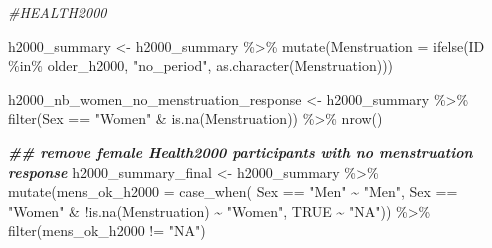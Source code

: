 \documentclass[
]{article}
\newenvironment{Shaded}{\begin{snugshade}}{\end{snugshade}}
\newcommand{\AttributeTok}[1]{\textcolor[rgb]{0.77,0.63,0.00}{#1}}
\newcommand{\CommentTok}[1]{\textcolor[rgb]{0.56,0.35,0.01}{\textit{#1}}}
\newcommand{\ConstantTok}[1]{\textcolor[rgb]{0.00,0.00,0.00}{#1}}
\newcommand{\DocumentationTok}[1]{\textcolor[rgb]{0.56,0.35,0.01}{\textbf{\textit{#1}}}}
\newcommand{\FunctionTok}[1]{\textcolor[rgb]{0.00,0.00,0.00}{#1}}
\newcommand{\NormalTok}[1]{#1}
\newcommand{\OtherTok}[1]{\textcolor[rgb]{0.56,0.35,0.01}{#1}}
\newcommand{\SpecialCharTok}[1]{\textcolor[rgb]{0.00,0.00,0.00}{#1}}
\newcommand{\StringTok}[1]{\textcolor[rgb]{0.31,0.60,0.02}{#1}}
\begin{document}
\begin{Shaded}
\begin{Highlighting}[]
\CommentTok{\#HEALTH2000}

\NormalTok{h2000\_summary }\OtherTok{\textless{}{-}}\NormalTok{ h2000\_summary }\SpecialCharTok{\%\textgreater{}\%}
  \FunctionTok{mutate}\NormalTok{(}\AttributeTok{Menstruation =} \FunctionTok{ifelse}\NormalTok{(ID }\SpecialCharTok{\%in\%}\NormalTok{ older\_h2000, }\StringTok{"no\_period"}\NormalTok{, }\FunctionTok{as.character}\NormalTok{(Menstruation)))}

\NormalTok{h2000\_nb\_women\_no\_menstruation\_response }\OtherTok{\textless{}{-}}\NormalTok{ h2000\_summary }\SpecialCharTok{\%\textgreater{}\%} \FunctionTok{filter}\NormalTok{(Sex }\SpecialCharTok{==} \StringTok{"Women"} \SpecialCharTok{\&} \FunctionTok{is.na}\NormalTok{(Menstruation)) }\SpecialCharTok{\%\textgreater{}\%} \FunctionTok{nrow}\NormalTok{()}

\DocumentationTok{\#\# remove female Health2000 participants with no menstruation response}
\NormalTok{h2000\_summary\_final }\OtherTok{\textless{}{-}}\NormalTok{ h2000\_summary }\SpecialCharTok{\%\textgreater{}\%}
  \FunctionTok{mutate}\NormalTok{(}\AttributeTok{mens\_ok\_h2000 =} \FunctionTok{case\_when}\NormalTok{(}
\NormalTok{    Sex }\SpecialCharTok{==} \StringTok{"Men"} \SpecialCharTok{\textasciitilde{}} \StringTok{"Men"}\NormalTok{,}
\NormalTok{    Sex }\SpecialCharTok{==} \StringTok{"Women"} \SpecialCharTok{\&} \SpecialCharTok{!}\FunctionTok{is.na}\NormalTok{(Menstruation)  }\SpecialCharTok{\textasciitilde{}} \StringTok{"Women"}\NormalTok{,}
    \ConstantTok{TRUE} \SpecialCharTok{\textasciitilde{}} \StringTok{"NA"}\NormalTok{)) }\SpecialCharTok{\%\textgreater{}\%}
  \FunctionTok{filter}\NormalTok{(mens\_ok\_h2000 }\SpecialCharTok{!=} \StringTok{"NA"}\NormalTok{)}


\end{Highlighting}
\end{Shaded}
\end{document}
